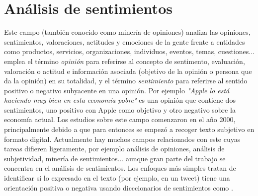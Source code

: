 \section*{Análisis de sentimientos}
Este campo (también conocido como minería de opiniones) analiza las opiniones, sentimientos, valoraciones, actitudes y emociones de la gente frente a entidades como productos, servicios, organizaciones, individuos, eventos, temas, cuestiones...\newline
\citet{9781107017894} emplea el término \textsl{opinión} para referirse al concepto de sentimento, evaluación, valoración o actitud e información asociada (objetivo de la opinión o persona que da la opinión) en su totalidad, y el término \textsl{sentimiento} para referirse al sentido positivo o negativo subyacente en una opinión. Por ejemplo \textsl{"Apple lo está haciendo muy bien en esta economía pobre"} es una opinión que contiene dos sentimientos, uno positivo con Apple como objetivo y otro negativo sobre la economía actual.\newline
 Los estudios sobre este campo comenzaron en el año 2000, principalmente debido a que para entonces se empezó a recoger texto subjetivo en formato digital. Actualmente hay muchos campos relacionados con este cuyas tareas difieren ligeramente, por ejemplo análisis de opiniones, análisis de subjetividad, minería de sentimientos... aunque gran parte del trabajo se concentra en el análisis de sentimientos.
 Los enfoques más simples tratan de identificar si lo expresado en el texto (por ejemplo, en un tweet) tiene una orientación positiva o negativa usando dicccionarios de sentimientos como \citet{whissell1989dictionary}. 









 